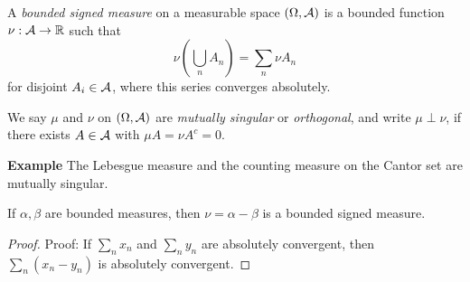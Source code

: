 
\begin{definition}
    A \emph{bounded signed measure} on a measurable space $(\Omega, \cal{A})$ is a bounded function $\nu : \cal{A} \to \R$ such that
    \[ \nu\left(\bigcup_{n} A_n\right) = \sum_{n} \nu A_n \]
    for disjoint $A_i \in \cal{A}$, where this series converges absolutely.
\end{definition}

\begin{definition}
    We say $\mu$ and $\nu$ on $(\Omega, \cal{A})$ are \emph{mutually singular} or \emph{orthogonal}, and write $\mu \perp \nu$, if there exists $A \in \cal{A}$ with $\mu A = \nu A^{c} = 0$.
\end{definition}

\begin{example}{\textbf{Example}}
    The Lebesgue measure and the counting measure on the Cantor set are mutually singular.
\end{example}

\begin{lemma}
    If $\alpha, \beta$ are bounded measures, then $\nu = \alpha - \beta$ is a bounded signed measure.
\end{lemma}
\begin{proof}{Proof:}
    If $\sum_{n} x_n$ and $\sum_{n} y_n$ are absolutely convergent, then $\sum_{n} (x_n - y_n)$ is absolutely convergent.
\end{proof}

